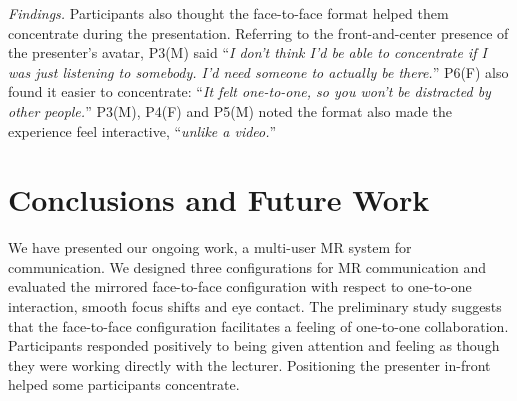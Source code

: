 \documentclass[sigchi-a]{acmart}
\begin{document}

\textit{Findings.}
Participants also thought the face-to-face format helped them concentrate during the presentation. Referring to the front-and-center presence of the presenter's avatar, P3(M) said ``\textit{I don't think I'd be able to concentrate if I was just listening to somebody. I'd need someone to actually be there.}'' P6(F) also found it easier to concentrate: ``\textit{It felt one-to-one, so you won't be distracted by other people.}'' P3(M), P4(F) and P5(M) noted the format also made the experience feel interactive, ``\textit{unlike a video.}''
\section{Conclusions and Future Work}

We have presented our ongoing work, a multi-user MR system for communication. We designed three configurations for MR communication and evaluated the mirrored face-to-face configuration with respect to one-to-one interaction, smooth focus shifts and eye contact.
The preliminary study suggests that the face-to-face configuration facilitates a feeling of one-to-one collaboration. Participants responded positively to being given attention and feeling as though they were working directly with the lecturer. Positioning the presenter in-front helped some participants concentrate.%
\end{document}
